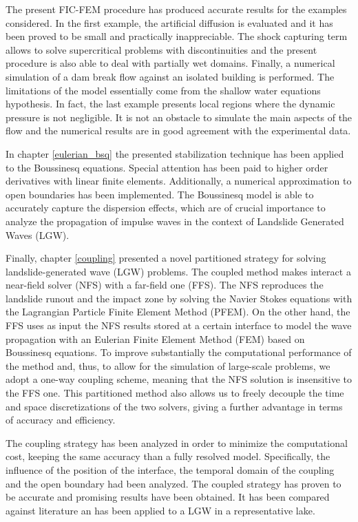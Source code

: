 The present FIC-FEM procedure has produced accurate results for the examples considered.
In the first example, the artificial diffusion is evaluated and it has been proved to be small and practically inappreciable. The shock capturing term allows to solve supercritical problems with discontinuities and the present procedure is also able to deal with partially wet domains. Finally, a numerical simulation of a dam break flow against an isolated building is performed.
The limitations of the model essentially come from the shallow water equations hypothesis. In fact, the last example presents local regions where the dynamic pressure is not negligible. It is not an obstacle to simulate the main aspects of the flow and the numerical results are in good agreement with the experimental data.

In chapter \ref{eulerian_bsq} the presented stabilization technique has been applied to the Boussinesq equations. Special attention has been paid to higher order derivatives with linear finite elements. Additionally, a numerical approximation to open boundaries has been implemented. The Boussinesq model is able to accurately capture the dispersion effects, which are of crucial importance to analyze the propagation of impulse waves in the context of Landslide Generated Waves (LGW).

Finally, chapter \ref{coupling} presented a novel partitioned strategy for solving landslide-generated wave (LGW) problems. The coupled method makes interact a near-field solver (NFS) with a far-field one (FFS). The NFS reproduces the landslide runout and the impact zone by solving the Navier Stokes equations with the Lagrangian Particle Finite Element Method (PFEM). On the other hand, the FFS uses as input the NFS results stored at a certain interface to model the wave propagation with an Eulerian Finite Element Method (FEM) based on Boussinesq equations. To improve substantially the computational performance of the method and, thus, to allow for the simulation of large-scale problems, we adopt a one-way coupling scheme, meaning that the NFS solution is insensitive to the FFS one. This partitioned method also allows us to freely decouple the time and space discretizations of the two solvers, giving a further advantage in terms of accuracy and efficiency.

The coupling strategy has been analyzed in order to minimize the computational cost, keeping the same accuracy than a fully resolved model. Specifically, the influence of the position of the interface, the temporal domain of the coupling and the open boundary had been analyzed.
The coupled strategy has proven to be accurate and promising results have been obtained. It has been compared against literature an has been applied to a LGW in a representative lake.



